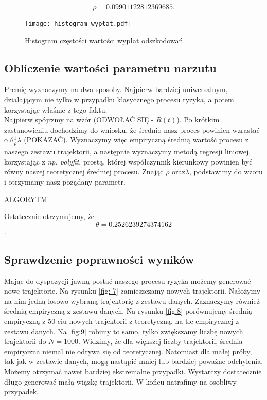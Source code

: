 \documentclass{article}
\theoremstyle{break}
\numberwithin{equation}{subsection}
\numberwithin{figure}{section}
\begin{document}
\begin{equation}
 	\rho = 0.09901122812369685.
\end{equation} 

\begin{figure}[H]
	\center
	\texttt{[image: histogram\_wypłat.pdf]}
	\caption{Histogram częstości wartości wypłat odszkodowań}
	\label{fig: 5}
\end{figure}

\subsection{Obliczenie wartości parametru narzutu}

Premię wyznaczymy na dwa sposoby. Najpierw bardziej uniwersalnym, działającym nie tylko w przypadku klasycznego procesu ryzyka, a potem korzystając właśnie z tego faktu. \\
Najpierw spójrzmy na wzór (ODWOŁAĆ SIĘ - $R(t)$). Po krótkim zastanowieniu dochodzimy do wniosku, że średnio nasz proces powinien wzrastać o $\theta \frac{1}{\rho} \lambda$ (POKAZAĆ).
Wyznaczymy więc empiryczną średnią wartość procesu z naszego zestawu trajektorii, a następnie wyznaczymy metodą regresji liniowej, korzystając z \emph{np. polyfit}, prostą, której współczynnik kierunkowy powinien być równy naszej teoretycznej średniej procesu.
Znając $\rho$ oraz$ \lambda$, podstawimy do wzoru i otrzymamy nasz pożądany parametr.

ALGORYTM

Ostatecznie otrzymujemy, że $$\theta = 0.2526239274374162$$.


\subsection{Sprawdzenie poprawności wyników}

Mając do dyspozycji jawną postać naszego procesu ryzyka możemy generować nowe trajektorie. Na rysunku \ref{fig: 7} zamieszczamy nowych trajektorii. Nałożymy na nim jedną losowo wybraną trajektorię z zestawu danych. Zaznaczymy również średnią empiryczną z zestawu danych.
Na rysunku \ref{fig:8} porównujemy średnią empiryczną z 50-ciu nowych trajektorii z teoretyczną, na tle empirycznej z zestawu danych. Na \ref{fig:9} robimy to samo, tylko zwiększamy liczbę nowych trajektorii do $N=1000$. Widzimy, że dla większej liczby trajektorii, średnia empiryczna niemal nie odrywa się od teoretycznej.
Natomiast dla małej próby, tak jak w zestawie danych, mogą nastąpić mniej lub bardziej poważne odchylenia. Możemy otrzymać nawet bardziej ekstremalne przypadki. Wystarczy dostatecznie długo generować małą wiązkę trajektorii. W końcu natrafimy na osobliwy przypadek.
\end{document}
